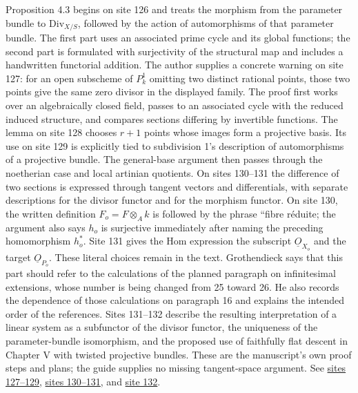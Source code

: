 \documentclass[10pt,a4paper]{article}
\begin{document}
Proposition 4.3 begins on site 126 and treats the morphism from the parameter bundle to \(\mathrm{Div}_{X/S}\), followed by the action of automorphisms of that parameter bundle. The first part uses an associated prime cycle and its global functions; the second part is formulated with surjectivity of the structural map and includes a handwritten functorial addition. The author supplies a concrete warning on site 127: for an open subscheme of \(P^1_k\) omitting two distinct rational points, those two points give the same zero divisor in the displayed family. The proof first works over an algebraically closed field, passes to an associated cycle with the reduced induced structure, and compares sections differing by invertible functions. The lemma on site 128 chooses \(r+1\) points whose images form a projective basis. Its use on site 129 is explicitly tied to subdivision 1's description of automorphisms of a projective bundle. The general-base argument then passes through the noetherian case and local artinian quotients. On sites 130--131 the difference of two sections is expressed through tangent vectors and differentials, with separate descriptions for the divisor functor and for the morphism functor. On site 130, the written definition \(F_o=F\otimes_A k\) is followed by the phrase ``fibre réduite; the argument also says \(h_o\) is surjective immediately after naming the preceding homomorphism \(h_o^*\). Site 131 gives the Hom expression the subscript \(\underline O_{X_o}\) and the target \(\underline O_{P_o}\). These literal choices remain in the text. Grothendieck says that this part should refer to the calculations of the planned paragraph on infinitesimal extensions, whose number is being changed from 25 toward 26. He also records the dependence of those calculations on paragraph 16 and explains the intended order of the references. Sites 131--132 describe the resulting interpretation of a linear system as a subfunctor of the divisor functor, the uniqueness of the parameter-bundle isomorphism, and the proposed use of faithfully flat descent in Chapter V with twisted projective bundles. These are the manuscript's own proof steps and plans; the guide supplies no missing tangent-space argument. See \href{https://grothendieck.umontpellier.fr/web/viewer.html?file=../25.pdf#page=128}{sites 127--129}, \href{https://grothendieck.umontpellier.fr/web/viewer.html?file=../25.pdf#page=131}{sites 130--131}, and \href{https://grothendieck.umontpellier.fr/web/viewer.html?file=../25.pdf#page=133}{site 132}.
\end{document}
